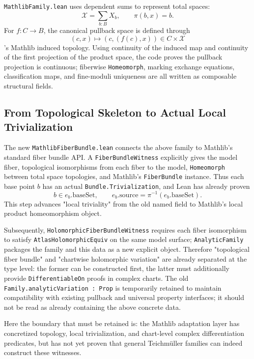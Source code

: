 \documentclass[UTF8,a4paper,11pt]{article}
\begin{document}
\texttt{MathlibFamily.lean} uses dependent sums to represent total spaces:
\[
  \mathcal X=\sum_{b:B}X_b,\qquad \pi(b,x)=b.
\]
For \(f:C\to B\), the canonical pullback space is defined through
\[
  (c,x)\longmapsto(c,(f(c),x))\in C\times\mathcal X
\]
's Mathlib induced topology. Using continuity of the induced map and continuity of the first projection of the product space, the code proves the pullback projection is continuous; fiberwise \texttt{Homeomorph}, marking exchange equations, classification maps, and fine-moduli uniqueness are all written as composable structural fields.

\clearpage
\subsection{From Topological Skeleton to Actual Local Trivialization}

The new \texttt{MathlibFiberBundle.lean} connects the above family to Mathlib's standard fiber bundle API. A
\texttt{FiberBundleWitness} explicitly gives the model fiber, topological isomorphisms from each fiber to the model, \texttt{Homeomorph} between total space topologies, and Mathlib's \texttt{FiberBundle} instance. Thus each base point $b$ has an actual
\texttt{Bundle.Trivialization}, and Lean has already proven
\[
  b\in e_b.\mathrm{baseSet},
  \qquad
  e_b.\mathrm{source}=\pi^{-1}(e_b.\mathrm{baseSet}).
\]
This step advances "local triviality" from the old named field to Mathlib's local product homeomorphism object.

Subsequently, \texttt{HolomorphicFiberBundleWitness} requires each fiber isomorphism to satisfy
\texttt{AtlasHolomorphicEquiv} on the same model surface; \texttt{AnalyticFamily} packages the family and this data as a new explicit object.
Therefore "topological fiber bundle" and "chartwise holomorphic variation" are already separated at the type level: the former can be constructed first, the latter must additionally provide
\texttt{DifferentiableOn} proofs in complex charts. The old \texttt{Family.analyticVariation : Prop} is temporarily retained to maintain compatibility with existing pullback and universal property interfaces; it should not be read as already containing the above concrete data.

Here the boundary that must be retained is: the Mathlib adaptation layer has concretized topology, local trivialization, and chart-level complex differentiation predicates, but has not yet proven that general Teichmüller families can indeed construct these witnesses.
\end{document}
